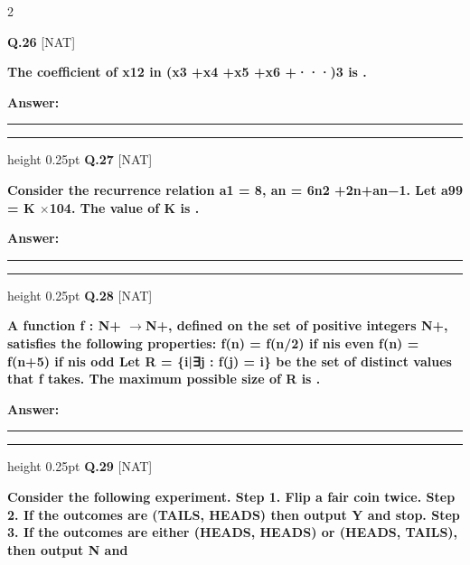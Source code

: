 \documentclass[a4paper,10pt,twoside]{article}
\begin{document}
\begin{multicols}{2}
\vspace{6pt}
\vspace{3pt}

\noindent\textbf{Q.26} \hfill {\footnotesize\textsf{[NAT]}}
\par\vspace{2pt}
{\bfseries The coefﬁcient of x12 in (x3 +x4 +x5 +x6 +···)3 is
. \par}
\par\vspace{3pt}\noindent\textbf{Answer:} \rule{3.2cm}{0.4pt}
\par\vspace{6pt}\hrule height 0.25pt\vspace{6pt}
\noindent\textbf{Q.27} \hfill {\footnotesize\textsf{[NAT]}}
\par\vspace{2pt}
{\bfseries Consider the recurrence relation a1 = 8, an = 6n2 +2n+an−1. Let a99 = K $\times$104. The value
of K is
. \par}
\par\vspace{3pt}\noindent\textbf{Answer:} \rule{3.2cm}{0.4pt}
\par\vspace{6pt}\hrule height 0.25pt\vspace{6pt}
\noindent\textbf{Q.28} \hfill {\footnotesize\textsf{[NAT]}}
\par\vspace{2pt}
{\bfseries A function f : N+ $\to$N+, deﬁned on the set of positive integers N+, satisﬁes the following
properties:
f(n) = f(n/2)
if nis even
f(n) = f(n+5)
if nis odd
Let R = \{i|∃j : f(j) = i\} be the set of distinct values that f takes. The maximum possible size
of R is
. \par}
\par\vspace{3pt}\noindent\textbf{Answer:} \rule{3.2cm}{0.4pt}
\par\vspace{6pt}\hrule height 0.25pt\vspace{6pt}
\noindent\textbf{Q.29} \hfill {\footnotesize\textsf{[NAT]}}
\par\vspace{2pt}
{\bfseries Consider the following experiment.
Step 1. Flip a fair coin twice.
Step 2. If the outcomes are (TAILS, HEADS) then output Y and stop.
Step 3. If the outcomes are either (HEADS, HEADS) or (HEADS, TAILS), then output N and
}
\end{multicols}
\end{document}
